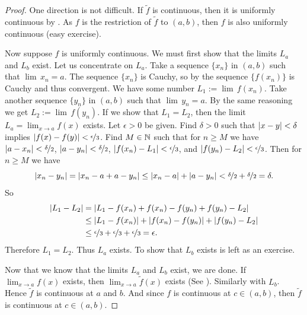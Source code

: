 \begin{proof}
One direction is not difficult.  If $\widetilde{f}$ is continuous, then
it is uniformly continuous by .  As $f$ is the
restriction of $\widetilde{f}$ to $(a,b)$, then $f$ is also uniformly continuous
(easy exercise).

Now suppose $f$ is uniformly continuous.  We must first show
that the limits $L_a$ and $L_b$ exist.  Let us concentrate on $L_a$.
Take a sequence $\{ x_n \}$ in $(a,b)$ such that $\lim\, x_n = a$.
The sequence $\{ x_n \}$ is Cauchy, so by
the sequence $\{ f(x_n) \}$ is Cauchy and thus convergent.
We have some number $L_1 := \lim\, f(x_n)$.  Take another sequence
$\{ y_n \}$ in $(a,b)$ such that $\lim\, y_n = a$.  By the same reasoning
we get $L_2 := \lim\, f(y_n)$.  If we show that $L_1 = L_2$, then
the limit $L_a = \lim_{x\to a} f(x)$ exists.  Let $\epsilon > 0$ be given.
Find $\delta > 0$ such that $\left\lvert {x-y} \right\rvert < \delta$ implies $\left\lvert {f(x)-f(y)} \right\rvert <
\nicefrac{\epsilon}{3}$.  Find $M \in {\mathbb{N}}$ such that for
$n \geq M$ we have $\left\lvert {a-x_n} \right\rvert < \nicefrac{\delta}{2}$,
$\left\lvert {a-y_n} \right\rvert < \nicefrac{\delta}{2}$,
$\left\lvert {f(x_n)-L_1} \right\rvert < \nicefrac{\epsilon}{3}$, and
$\left\lvert {f(y_n)-L_2} \right\rvert < \nicefrac{\epsilon}{3}$.  Then for $n \geq M$ we have
\begin{equation*}
\left\lvert {x_n-y_n} \right\rvert = 
\left\lvert {x_n-a+a-y_n} \right\rvert \leq
\left\lvert {x_n-a} \right\rvert+\left\lvert {a-y_n} \right\rvert < \nicefrac{\delta}{2} + \nicefrac{\delta}{2} =
\delta.
\end{equation*}
So
\begin{equation*}
\begin{split}
\left\lvert {L_1-L_2} \right\rvert &=
\left\lvert {L_1-f(x_n)+f(x_n)-f(y_n)+f(y_n)-L_2} \right\rvert \\
& \leq 
\left\lvert {L_1-f(x_n)} \right\rvert+\left\lvert {f(x_n)-f(y_n)} \right\rvert+\left\lvert {f(y_n)-L_2} \right\rvert \\
& \leq
\nicefrac{\epsilon}{3} + \nicefrac{\epsilon}{3} + \nicefrac{\epsilon}{3}
=
\epsilon .
\end{split}
\end{equation*}
Therefore $L_1 = L_2$.
Thus $L_a$ exists.  To show that $L_b$ exists is left as an exercise.

Now that we know that the
limits $L_a$ and $L_b$ exist, we are done.  If $\lim_{x\to a} f(x)$
exists, then $\lim_{x\to a} \widetilde{f}(x)$ exists
(See ).  Similarly with $L_b$.
Hence $\widetilde{f}$ is continuous at $a$ and $b$.  
And since $f$ is continuous at $c \in (a,b)$, then
$\widetilde{f}$ is continuous at $c \in (a,b)$.
\end{proof}

